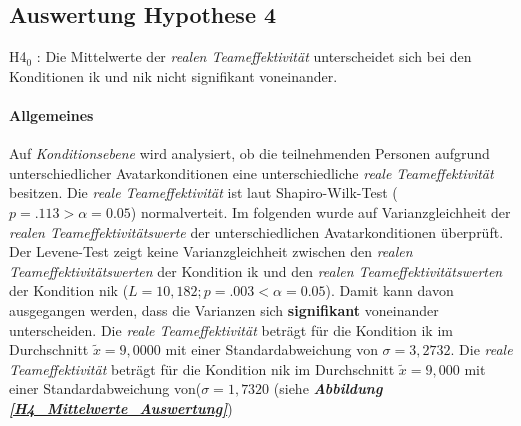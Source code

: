 \documentclass[a4paper,11pt]{article}%
\renewcommand{\\}{\vspace*{0.5\baselineskip} \newline}
\begin{document}
	\subsection{Auswertung Hypothese 4}
H4$_{0}$ : Die Mittelwerte der \textit{realen Teameffektivität} unterscheidet sich bei den Konditionen \ac{ik} und \ac{nik} nicht signifikant voneinander.

\paragraph{Allgemeines}

Auf \textit{Konditionsebene} wird analysiert, ob die teilnehmenden Personen aufgrund unterschiedlicher Avatarkonditionen eine unterschiedliche \textit{reale Teameffektivität} besitzen.\\
Die \textit{reale Teameffektivität} ist laut Shapiro-Wilk-Test ($p = .113 > \alpha = 0.05$) normalverteit.\\
Im folgenden wurde auf Varianzgleichheit der \textit{realen Teameffektivitätswerte} der unterschiedlichen Avatarkonditionen überprüft. Der Levene-Test zeigt keine Varianzgleichheit zwischen den \textit{realen Teameffektivitätswerten} der Kondition \ac{ik} und den \textit{realen Teameffektivitätswerten} der Kondition \ac{nik} ($L = 10,182; p=.003 < \alpha = 0.05$). Damit kann davon ausgegangen werden, dass die Varianzen sich \textbf{signifikant} voneinander unterscheiden. \\
Die \textit{reale Teameffektivität} beträgt für die Kondition \ac{ik} im Durchschnitt $\tilde x = 9,0000$ mit einer Standardabweichung von $\sigma = 3,2732$.\newline 
Die \textit{reale Teameffektivität} beträgt für die Kondition \ac{nik} im Durchschnitt $\tilde x = 9,000$ mit einer Standardabweichung von($\sigma = 1,7320$ (siehe \textbf{\textit{Abbildung \ref{H4_Mittelwerte_Auswertung}}})

\end{document}
